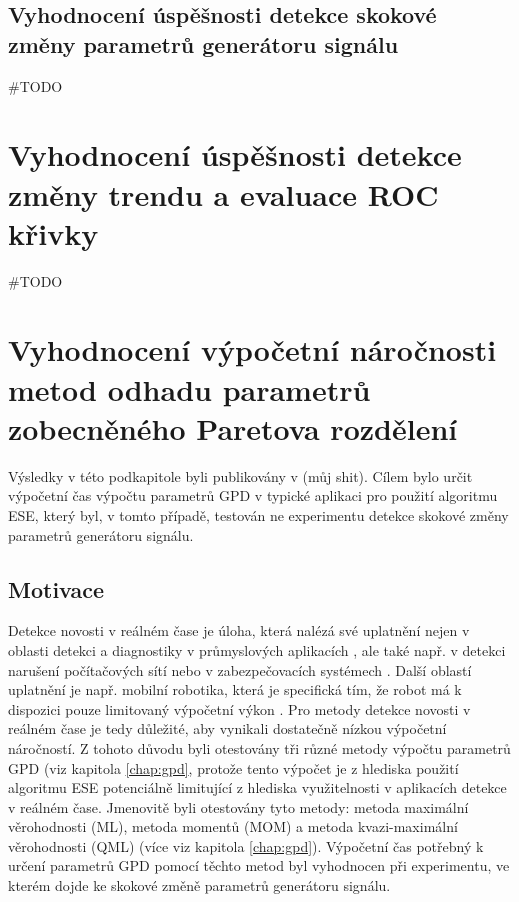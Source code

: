 \subsection{Vyhodnocení úspěšnosti detekce skokové změny parametrů generátoru signálu}
\#TODO
\section{Vyhodnocení úspěšnosti detekce změny trendu a evaluace ROC křivky}
\#TODO
\section{Vyhodnocení výpočetní náročnosti metod odhadu parametrů zobecněného Paretova rozdělení}
Výsledky v této podkapitole byli publikovány v (můj shit). Cílem bylo určit výpočetní čas výpočtu parametrů GPD v typické aplikaci pro použití algoritmu ESE, který byl, v tomto případě, testován ne experimentu detekce skokové změny parametrů generátoru signálu.
\subsection{Motivace}
Detekce novosti v reálném čase je úloha, která nalézá své uplatnění nejen v oblasti detekci a diagnostiky v průmyslových aplikacích \cite{fault}, ale také např. v detekci narušení počítačových sítí \cite{data_streams} nebo v zabezpečovacích systémech \cite{surveilance}. Další oblastí uplatnění je např. mobilní robotika, která je specifická tím, že robot má k dispozici pouze limitovaný výpočetní výkon \cite{robotics_marslan,robotics}. Pro metody detekce novosti v reálném čase je tedy důležité, aby vynikali dostatečně nízkou výpočetní náročností. Z tohoto důvodu byli otestovány tři různé metody výpočtu parametrů GPD (viz kapitola \ref{chap:gpd}, protože tento výpočet je z hlediska použití algoritmu ESE potenciálně limitující z hlediska využitelnosti v aplikacích detekce v reálném čase. Jmenovitě byli otestovány tyto metody: metoda maximální věrohodnosti (ML), metoda momentů (MOM) a metoda kvazi-maximální věrohodnosti (QML) (více viz kapitola \ref{chap:gpd}). Výpočetní čas potřebný k určení parametrů GPD pomocí těchto metod byl vyhodnocen při experimentu, ve kterém dojde ke skokové změně parametrů generátoru signálu.

